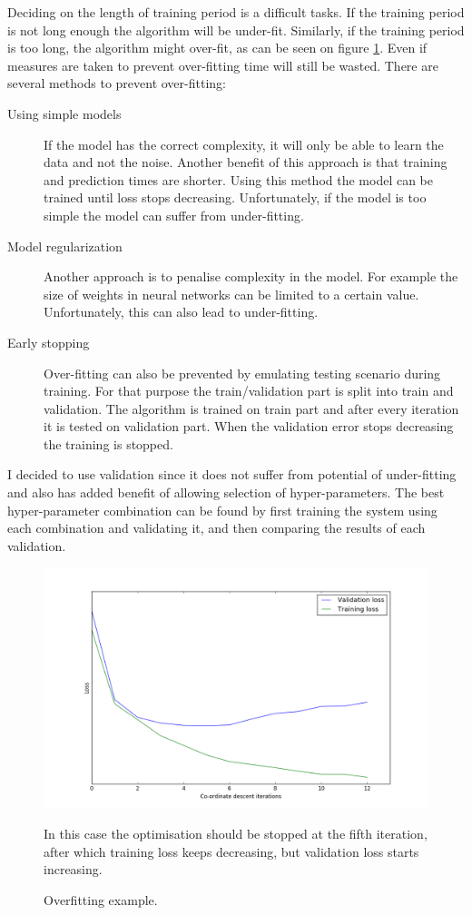 \documentclass[12pt,a4paper]{book}
\newcommand\note[1]{\vspace*{-0.5\baselineskip}\caption*{#1}}
\begin{document}
\label{overfitting}
Deciding on the length of training period is a difficult tasks.
If the training period is not long enough the algorithm will be under-fit.
Similarly, if the training period is too long, the algorithm might over-fit, as can be seen on figure \ref{fig:overfitting}.
Even if measures are taken to prevent over-fitting time will still be wasted.
There are several methods to prevent over-fitting:
\begin{description}
\item[Using simple models]
If the model has the correct complexity, it will only be able to learn the data and not the noise.
Another benefit of this approach is that training and prediction times are shorter.
Using this method the model can be trained until loss stops decreasing.
Unfortunately, if the model is too simple the model can suffer from under-fitting.

\item[Model regularization]
Another approach is to penalise complexity in the model.
For example the size of weights in neural networks can be limited to a certain value.
Unfortunately, this can also lead to under-fitting.

\item[Early stopping] 
Over-fitting can also be prevented by emulating testing scenario during training.
For that purpose the train/validation part is split into train and validation.
The algorithm is trained on train part and after every iteration it is tested on validation part.
When the validation error stops decreasing the training is stopped.
\end{description}
I decided to use validation since it does not suffer from potential of under-fitting and also has added benefit of allowing selection of hyper-parameters.
The best hyper-parameter combination can be found by first training the system using each combination and validating it, and then comparing the results of each validation.

\begin{figure}[ht]
\centering
\includegraphics[scale=0.5]{overfitting}
\caption{Overfitting example.}
\note{In this case the optimisation should be stopped at the fifth iteration, after which training loss keeps decreasing, but validation loss starts increasing.}
\label{fig:overfitting}
\end{figure}
\end{document}
